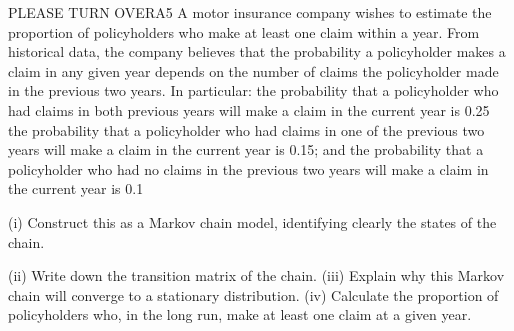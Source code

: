 \documentclass[a4paper,12pt]{article}
\begin{document}
PLEASE TURN OVERA5
A motor insurance company wishes to estimate the proportion of policyholders who
make at least one claim within a year. From historical data, the company believes that
the probability a policyholder makes a claim in any given year depends on the number
of claims the policyholder made in the previous two years. In particular:
the probability that a policyholder who had claims in both previous years will
make a claim in the current year is 0.25
the probability that a policyholder who had claims in one of the previous two
years will make a claim in the current year is 0.15; and
the probability that a policyholder who had no claims in the previous two years
will make a claim in the current year is 0.1


\begin{enumerate}
(i) Construct this as a Markov chain model, identifying clearly the states of the
chain.

(ii) Write down the transition matrix of the chain.
(iii) Explain why this Markov chain will converge to a stationary distribution. 
(iv) Calculate the proportion of policyholders who, in the long run, make at least
one claim at a given year.
\end{enumerate}

\end{document}
